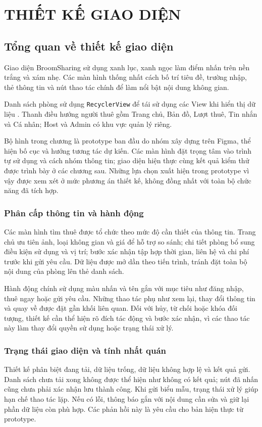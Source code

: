 \chapstart
\section{THIẾT KẾ GIAO DIỆN}
\subsection{Tổng quan về thiết kế giao diện}
Giao diện BroomSharing sử dụng xanh lục, xanh ngọc làm điểm nhấn trên nền trắng và xám nhẹ. Các màn hình thống nhất cách bố trí tiêu đề, trường nhập, thẻ thông tin và nút thao tác chính để làm nổi bật nội dung không gian.

Danh sách phòng sử dụng \texttt{RecyclerView} để tái sử dụng các View khi hiển thị dữ liệu \parencite{android_recycler}. Thanh điều hướng người thuê gồm Trang chủ, Bản đồ, Lượt thuê, Tin nhắn và Cá nhân; Host và Admin có khu vực quản lý riêng.

Bộ hình trong chương là prototype ban đầu do nhóm xây dựng trên Figma, thể hiện bố cục và hướng tương tác dự kiến. Các màn hình đặt trọng tâm vào trình tự sử dụng và cách nhóm thông tin; giao diện hiện thực cùng kết quả kiểm thử được trình bày ở các chương sau. Những lựa chọn xuất hiện trong prototype vì vậy được xem xét ở mức phương án thiết kế, không đồng nhất với toàn bộ chức năng đã tích hợp.

\subsubsection{Phân cấp thông tin và hành động}
Các màn hình tìm thuê được tổ chức theo mức độ cần thiết của thông tin. Trang chủ ưu tiên ảnh, loại không gian và giá để hỗ trợ so sánh; chi tiết phòng bổ sung điều kiện sử dụng và vị trí; bước xác nhận tập hợp thời gian, liên hệ và chi phí trước khi gửi yêu cầu. Dữ liệu được mở dần theo tiến trình, tránh đặt toàn bộ nội dung của phòng lên thẻ danh sách.

Hành động chính sử dụng màu nhấn và tên gắn với mục tiêu như đăng nhập, thuê ngay hoặc gửi yêu cầu. Những thao tác phụ như xem lại, thay đổi thông tin và quay về được đặt gần khối liên quan. Đối với hủy, từ chối hoặc khóa đối tượng, thiết kế cần thể hiện rõ đích tác động và bước xác nhận, vì các thao tác này làm thay đổi quyền sử dụng hoặc trạng thái xử lý.

\subsubsection{Trạng thái giao diện và tính nhất quán}
Thiết kế phân biệt đang tải, dữ liệu trống, dữ liệu không hợp lệ và kết quả gửi. Danh sách chưa tải xong không được thể hiện như không có kết quả; nút đã nhấn cũng chưa phải xác nhận lưu thành công. Khi gửi biểu mẫu, trạng thái xử lý giúp hạn chế thao tác lặp. Nếu có lỗi, thông báo gắn với nội dung cần sửa và giữ lại phần dữ liệu còn phù hợp. Các phản hồi này là yêu cầu cho bản hiện thực từ prototype.

